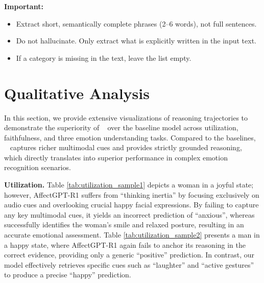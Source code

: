\documentclass{article}
\theoremstyle{plain}
\theoremstyle{definition}
\theoremstyle{remark}
\begin{document}
\begin{tcolorbox}
\vspace{0.2cm}
\textbf{Important:}
\begin{itemize}
    \item Extract short, semantically complete phrases (2--6 words), not full sentences.
    \item Do not hallucinate. Only extract what is explicitly written in the input text.
    \item If a category is missing in the text, leave the list empty.
\end{itemize}
\end{tcolorbox}


\section{Qualitative Analysis}
\label{sec:qualitative-analysis}
In this section, we provide extensive visualizations of reasoning trajectories to demonstrate the superiority of \ourmethod~ over the baseline model across utilization, faithfulness, and three emotion understanding tasks. Compared to the baselines, \ourmethod~ captures richer multimodal cues and provides strictly grounded reasoning, which directly translates into superior performance in complex emotion recognition scenarios.

\noindent\textbf{Utilization.} 
Table \ref{tab:utilization_sample1} depicts a woman in a joyful state; however, AffectGPT-R1 suffers from ``thinking inertia'' by focusing exclusively on audio cues and overlooking crucial happy facial expressions. By failing to capture any key multimodal cues, it yields an incorrect prediction of ``anxious'', whereas \ourmethod~ successfully identifies the woman's smile and relaxed posture, resulting in an accurate emotional assessment.
Table \ref{tab:utilization_sample2} presents a man in a happy state, where AffectGPT-R1 again fails to anchor its reasoning in the correct evidence, providing only a generic ``positive'' prediction. In contrast, our model effectively retrieves specific cues such as ``laughter'' and ``active gestures'' to produce a precise ``happy'' prediction.
\end{document}
